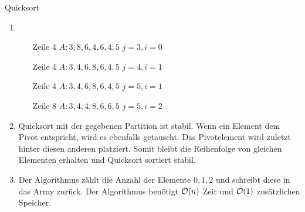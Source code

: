 \documentclass{article}
\begin{document}
\begin{exercise}{Quicksort}
  \begin{solution}
    \begin{enumerate}
      \item
            \begin{itemize}
              \item[Zeile 4] $A: 3, 8, 6, 4, 6, 4, 5$ \hfill $j = 3, i = 0$
              \item[Zeile 4] $A: 3, 4, 6, 8, 6, 4, 5$ \hfill $j = 4, i = 1$
              \item[Zeile 4] $A: 3, 4, 6, 8, 6, 4, 5$ \hfill $j = 5, i = 1$
              \item[Zeile 8] $A: 3, 4, 4, 8, 6, 6, 5$ \hfill $j = 5, i = 2$
            \end{itemize}
      \item Quicksort mit der gegebenen Partition ist stabil. Wenn ein Element dem Pivot entspricht, wird es ebenfalls getauscht. Das Pivotelement wird zuletzt hinter diesen anderen platziert. Somit bleibt die Reihenfolge von gleichen Elementen erhalten und Quicksort sortiert stabil.
      \item Der Algorithmus zählt die Anzahl der Elemente $0,1,2$ und schreibt diese in das Array zurück. Der Algorithmus benötigt $\mathcal{O}(n)$ Zeit und $\mathcal{O}(1)$ zusätzlichen Speicher.
    \end{enumerate}
  \end{solution}
\end{exercise}
\end{document}
